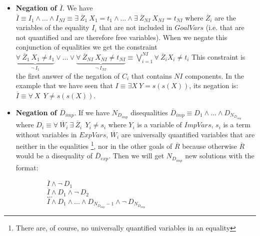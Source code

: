 \documentclass{tlp}
\begin{document}
        \begin{itemize}

           \item {\bf Negation of $\overline{I}$}. We have $\overline{I}
           \equiv I_1 \wedge \ldots \wedge I_{NI} \equiv \exists~
           \overline{Z}_1~ X_1 = t_1 \wedge \ldots \wedge \exists~
           \overline{Z}_{NI}~ X_{NI} = t_{NI} $ where
           $\overline{Z}_i$ are the variables of the equality $I_i$ that
           are not included in $GoalVars$ (i.e. that are not quantified
           and are therefore free variables). When we negate this
           conjunction of equalities we get the constraint 
                $
           \underbrace{\forall~ \overline{Z}_1~ X_1 \neq t_1} _{\neg~
           I_1} \vee \ldots \vee \underbrace{\forall~
           \overline{Z}_{NI}~ X_{NI} \neq t_{NI} } _{\neg~ I_{NI}}
           \equiv %
           \bigvee_{i=1}^{NI} \forall~ \overline{Z}_i X_i
           \neq t_i $ 
           This constraint is the first answer of the negation of $C_i$ that
           contains $NI$ components.  In the example that we have seen that $
           I \equiv \exists X ~ Y=s(s(X))$, its negation is: $\overline{I}
           \equiv \forall~ X~~ Y \neq s(s(X))$.

           \item {\bf Negation of $\overline{D}_{imp}$}. If we have
           $N_{D_{imp}}$ disequalities $\overline{D}_{imp} \equiv D_1
           \wedge \ldots \wedge D_{N_{D_{imp}}}$ where $ D_i \equiv
           \forall~ \overline{W}_i ~ \exists~ \overline{Z}_i ~~  Y_i
           \neq s_i$ where $Y_i$ is a variable of $ImpVars$, $s_i$ is
           a term without variables in $ExpVars$, $\overline{W}_i$ are
           universally quantified variables that are neither in the
           equalities \footnote{There are, of course, no universally
           quantified variables in an equality}, nor in the other
           goals of $\overline{R}$ because otherwise $\overline{R}$
           would be a disequality of $\overline{D}_{exp}$. Then we
           will get $N_{D_{imp}}$ new solutions with the format: 

           $~~~~~~~~~~~~~~~~~~~~\overline{I} \wedge \neg~ D_1 $ \\ 
           $~~~~~~~~~~~~~~~~~~~~\overline{I} \wedge
           D_1 \wedge \neg~ D_2 $ \\ 
           $~~~~~~~~~~~~~~~~~~~~\ldots $ \\ 
           $~~~~~~~~~~~~~~~~~~~~\overline{I} \wedge
           D_1 \wedge \ldots \wedge D_{N_{D_{imp}}-1} \wedge \neg~
           D_{N_{D_{imp}}}$ 


\end{itemize}
\end{document}
